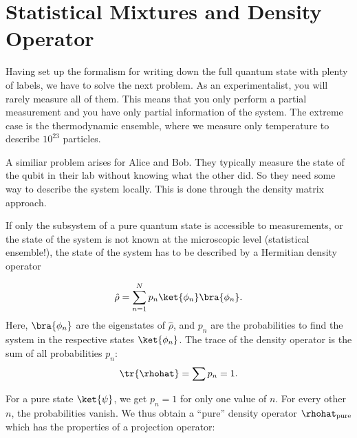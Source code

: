 \section{Statistical Mixtures and Density Operator}

Having set up the formalism for writing down the full quantum state with plenty of labels, we have to solve the next problem. As an experimentalist, you will rarely measure all of them. This means that you only perform a partial measurement and you have only partial information of the system. The extreme case is the thermodynamic ensemble, where we measure only temperature to describe $10^{23}$ particles.

A similiar problem arises for Alice and Bob. They typically measure the state of the qubit in their lab without knowing what the other did. So they need some way to describe the system locally. This is done through the density matrix approach.

If only the subsystem of a pure quantum state is accessible to measurements, or the state of the system is not known at the microscopic level (statistical ensemble!), the state of the system has to be described by a Hermitian density operator

\begin{align}
 \hat{\rho} = \sum_{n=1}^N p_n \ket{\phi_n}\bra{\phi_n}.
\end{align}
Here, $\bra{\phi_n}$ are the eigenstates of $\hat{\rho}$, and $p_n$ are the probabilities to find the system in the respective states $\ket{\phi_n}$. The trace of the density operator is the sum of all probabilities $p_n$:
\begin{align}
  \tr{\rhohat} = \sum p_n = 1.
\end{align}

For a pure state $\ket{\psi}$, we get $p_n=1$ for only one value of $n$. For every other $n$, the probabilities vanish. We thus obtain a ``pure'' density operator $\rhohat_{\text{pure}}$ which has the properties of a projection operator:

